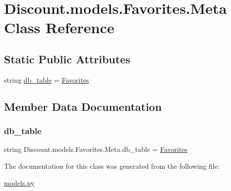 \hypertarget{class_discount_1_1models_1_1_favorites_1_1_meta}{}\section{Discount.\+models.\+Favorites.\+Meta Class Reference}
\label{class_discount_1_1models_1_1_favorites_1_1_meta}
\subsection*{Static Public Attributes}
\begin{DoxyCompactItemize}
\item 
string \hyperlink{class_discount_1_1models_1_1_favorites_1_1_meta_a627d292bf9009cf675aa191d33ae41c9}{db\+\_\+table} = \textquotesingle{}\hyperlink{class_discount_1_1models_1_1_favorites}{Favorites}\textquotesingle{}
\end{DoxyCompactItemize}


\subsection{Member Data Documentation}
\mbox{\label{class_discount_1_1models_1_1_favorites_1_1_meta_a627d292bf9009cf675aa191d33ae41c9}} 
\subsubsection{\texorpdfstring{db\+\_\+table}{db\_table}}
{\footnotesize\ttfamily string Discount.\+models.\+Favorites.\+Meta.\+db\+\_\+table = \textquotesingle{}\hyperlink{class_discount_1_1models_1_1_favorites}{Favorites}\textquotesingle{}\hspace{0.3cm}{\ttfamily [static]}}



The documentation for this class was generated from the following file\+:\begin{DoxyCompactItemize}
\item 
\hyperlink{models_8py}{models.\+py}\end{DoxyCompactItemize}
